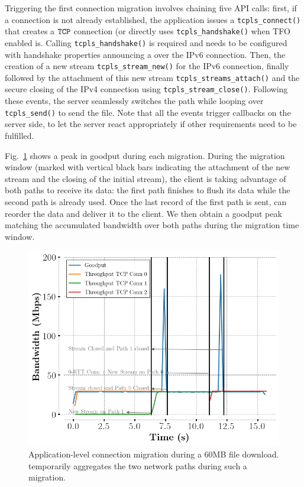 Triggering the first connection migration involves chaining five API calls: first, if a \tcp connection is not already established, the application issues a
\texttt{tcpls\_connect()} that creates a $\texttt{TCP}$ connection (or directly uses
\texttt{tcpls\_handshake()} when TFO enabled is. Calling 
\texttt{tcpls\_handshake()} is required and needs to be configured with 
handshake properties announcing a \join over the IPv6 connection. Then, the 
creation of a new stream \texttt{tcpls\_stream\_new()} for the IPv6 connection, 
finally followed by the attachment of this new stream 
\texttt{tcpls\_streams\_attach()} and the secure closing of the IPv4 \tcp 
connection using \texttt{tcpls\_stream\_close()}. Following these events, the 
server seamlessly switches the path while looping over \texttt{tcpls\_send()} 
to send the file. Note that all the events trigger callbacks on the server 
side, to let the server react appropriately if other requirements need to be 
fulfilled.

Fig.~\ref{fig:conn_migration} shows a peak in goodput during each migration. During the migration window (marked with vertical black bars indicating the attachment of the new stream and the closing of the initial stream), the client is taking advantage of both paths to receive its data: the first path finishes to flush its data while the second path is already used. Once the last record of the first path is sent, \tcpls can reorder the data and deliver it to the client. We then obtain a goodput peak matching the accumulated bandwidth over both paths during the migration time window.

\begin{figure}[!t]
  \begin{center}
    \includegraphics[width=.8\columnwidth]{figures/migration.png}
  \end{center}
\vspace{-0.5cm}
  \caption{Application-level connection migration during a 60MB file download.
    \tcpls temporarily aggregates the two network paths during such a migration.}
  \label{fig:conn_migration}
\end{figure}

